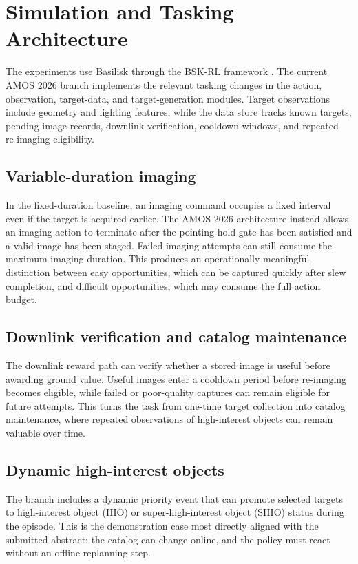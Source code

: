 \documentclass{amos}
\begin{document}
\section{Simulation and Tasking Architecture}

The experiments use Basilisk through the BSK-RL framework \cite{stephenson2024bskrl}. The current AMOS 2026 branch implements the relevant tasking changes in the action, observation, target-data, and target-generation modules. Target observations include geometry and lighting features, while the data store tracks known targets, pending image records, downlink verification, cooldown windows, and repeated re-imaging eligibility.

\subsection{Variable-duration imaging}

In the fixed-duration baseline, an imaging command occupies a fixed interval even if the target is acquired earlier. The AMOS 2026 architecture instead allows an imaging action to terminate after the pointing hold gate has been satisfied and a valid image has been staged. Failed imaging attempts can still consume the maximum imaging duration. This produces an operationally meaningful distinction between easy opportunities, which can be captured quickly after slew completion, and difficult opportunities, which may consume the full action budget.

\subsection{Downlink verification and catalog maintenance}

The downlink reward path can verify whether a stored image is useful before awarding ground value. Useful images enter a cooldown period before re-imaging becomes eligible, while failed or poor-quality captures can remain eligible for future attempts. This turns the task from one-time target collection into catalog maintenance, where repeated observations of high-interest objects can remain valuable over time.

\subsection{Dynamic high-interest objects}

The branch includes a dynamic priority event that can promote selected targets to high-interest object (HIO) or super-high-interest object (SHIO) status during the episode. This is the demonstration case most directly aligned with the submitted abstract: the catalog can change online, and the policy must react without an offline replanning step.
\end{document}
